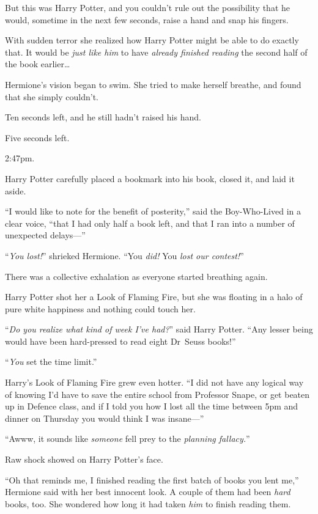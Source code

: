 But this was Harry Potter, and you couldn’t rule out the possibility that he
would, sometime in the next few seconds, raise a hand and snap his fingers.

With sudden terror she realized how Harry Potter might be able to do exactly
that. It would be \emph{just like him} to have \emph{already finished reading}
the second half of the book earlier…

Hermione’s vision began to swim. She tried to make herself breathe, and found
that she simply couldn’t.

Ten seconds left, and he still hadn’t raised his hand.

Five seconds left.

2:47pm.

Harry Potter carefully placed a bookmark into his book, closed it, and laid it
aside.

“I would like to note for the benefit of posterity,” said the Boy-Who-Lived in
a clear voice, “that I had only half a book left, and that I ran into a number
of unexpected delays—”

“\emph{You lost!}” shrieked Hermione. “You \emph{did!} You \emph{lost our
contest!}”

There was a collective exhalation as everyone started breathing again.

Harry Potter shot her a Look of Flaming Fire, but she was floating in a halo of
pure white happiness and nothing could touch her.

“\emph{Do you realize what kind of week I’ve had?}” said Harry Potter. “Any
lesser being would have been hard-pressed to read eight Dr~Seuss books!”

“\emph{You} set the time limit.”

Harry’s Look of Flaming Fire grew even hotter. “I did not have any logical way
of knowing I’d have to save the entire school from Professor Snape, or get
beaten up in Defence class, and if I told you how I lost all the time between
5pm and dinner on Thursday you would think I was insane—”

“Awww, it sounds like \emph{someone} fell prey to the \emph{planning fallacy.}”

Raw shock showed on Harry Potter’s face.

“Oh that reminds me, I finished reading the first batch of books you lent me,”
Hermione said with her best innocent look. A couple of them had been
\emph{hard} books, too. She wondered how long it had taken \emph{him} to finish
reading them.

